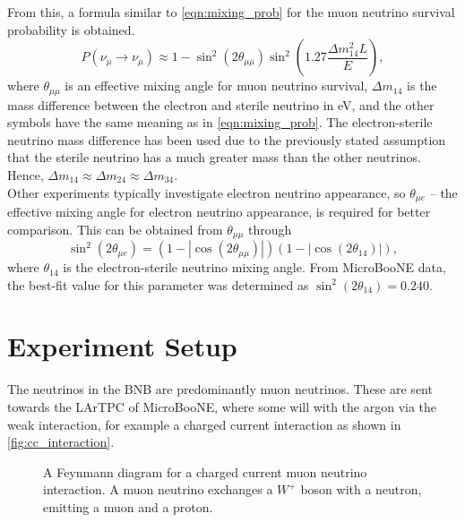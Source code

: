 \documentclass[reprint,
    nofootinbib,
    amsmath,amssymb,
    aps,
    10pt,
    nolongbibliography,
]{revtex4-2}
\begin{document}
From this, a formula similar to \autoref{eqn:mixing_prob} for the muon neutrino survival probability
is obtained.
\begin{equation}
    P(\nu_\mu \to \nu_\mu) \approx 1 - \sin^2{\left(2\theta_{\mu\mu}\right)} 
    \sin^2{\left(1.27 \frac{\Delta m_{14}^2 L}{E}\right)},
    \label{eqn:survival_prob}
\end{equation}
where $\theta_{\mu\mu}$ is an effective mixing angle for muon neutrino survival, $\Delta m_{14}$
is the mass difference between the electron and sterile neutrino in eV, and the other symbols
have the same meaning as in \autoref{eqn:mixing_prob}. The electron-sterile neutrino mass difference
has been used due to the previously stated assumption that the sterile neutrino has a much greater
mass than the other neutrinos. Hence, $\Delta m_{14} \approx \Delta m_{24} \approx \Delta m_{34}$.\\

Other experiments typically investigate electron neutrino appearance, so
$\theta_{\mu e}$ -- the effective mixing angle for electron neutrino appearance, is required for
better comparison. This can be obtained from $\theta_{\mu\mu}$ through
\begin{equation}
    \sin^2{\left(2\theta_{\mu e}\right)} = \left(1 - \left|\cos{\left(2\theta_{\mu\mu}\right)} \right|\right)
    \left(1 - \left|\cos{\left(2\theta_{14}\right)}\right|\right),
\end{equation}
where $\theta_{14}$ is the electron-sterile neutrino mixing angle. From MicroBooNE data, the
best-fit value for this parameter was determined as 
$\sin^2{\left(2\theta_{14}\right)} = 0.240$\cite{uboone_angle}.

\section{Experiment Setup}

The neutrinos in the BNB are predominantly muon neutrinos. These are sent towards the LArTPC of
MicroBooNE, where some will with the argon via the weak interaction, for example a charged current
interaction as shown in \autoref{fig:cc_interaction}. 

\begin{figure}[H]
    \centering
    \caption{A Feynmann diagram for a charged current muon neutrino interaction. A muon neutrino
    exchanges a $W^+$ boson with a neutron, emitting a muon and a proton.}
    \label{fig:cc_interaction}
\end{figure}
\end{document}
